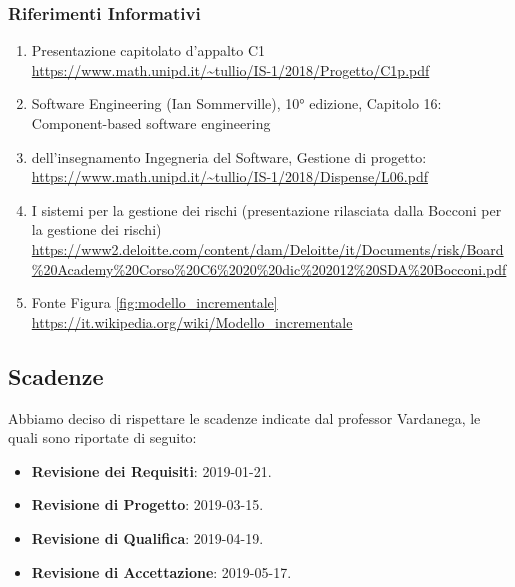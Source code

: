 		\subsubsection{Riferimenti Informativi}\label{rifinfo}
			\begin{enumerate}
				\item Presentazione capitolato d'appalto C1\\
				\url{https://www.math.unipd.it/~tullio/IS-1/2018/Progetto/C1p.pdf}
				\item Software Engineering (Ian Sommerville), 10° edizione, Capitolo 16: Component-based software engineering
				\item {} dell’insegnamento Ingegneria del Software, Gestione di progetto:\\
					\url{https://www.math.unipd.it/~tullio/IS-1/2018/Dispense/L06.pdf}
				\item I sistemi per la gestione dei rischi (presentazione rilasciata dalla Bocconi per la gestione dei rischi)\\
				\url{https://www2.deloitte.com/content/dam/Deloitte/it/Documents/risk/Board\%20Academy\%20Corso\%20C6\%2020\%20dic\%202012\%20SDA\%20Bocconi.pdf}
				\item Fonte Figura \ref{fig:modello_incrementale}\\
				\url{https://it.wikipedia.org/wiki/Modello_incrementale}
			\end{enumerate}

	\subsection{Scadenze}\label{Scadenze}
	Abbiamo deciso di rispettare le scadenze indicate dal professor Vardanega, le quali sono riportate di seguito:
	\begin{itemize}
		\item \textbf{Revisione dei Requisiti}: 2019-01-21.
		\item \textbf{Revisione di Progetto}: 2019-03-15.
		\item \textbf{Revisione di Qualifica}: 2019-04-19.
		\item \textbf{Revisione di Accettazione}: 2019-05-17.
	\end{itemize}

